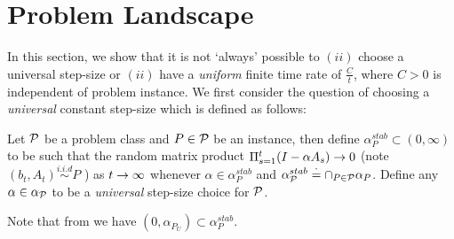 \section{Problem Landscape}\label{sec:land}
In this section, we show that it is not `always' possible to $(ii)$ choose a universal step-size or $(ii)$ have a \emph{uniform} finite time rate of $\frac{C}{t}$, where $C>0$ is independent of problem instance.
We first consider the question of choosing a \emph{universal} constant step-size which is defined as follows:
\begin{definition} Let $\P$ be a problem class and $P\in\P$ be an instance, then define $\alpha^{stab}_{P}\subset (0,\infty)$ to be such that the random matrix product $\Pi_{s=1}^t (I-\alpha A_s)\ra 0$ (note $(b_t,A_t)\overset{i.i.d}{\sim} P$ ) as $t\ra\infty$ whenever $\alpha\in \alpha^{stab}_P$ and $\alpha^{stab}_{\P}\eqdef\cap_{P\in \P}\alpha_{P}$. Define any $\alpha\in\alpha_{\P}$ to be a \emph{universal} step-size choice for $\P$.
\end{definition}
Note that from  we have $(0,\alpha_{P_U})\subset \alpha^{stab}_{P}$. 

